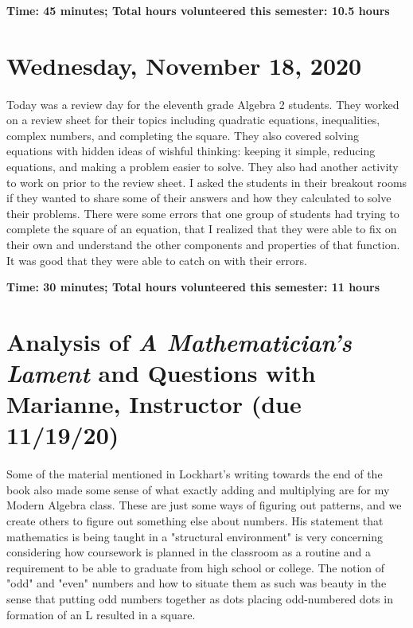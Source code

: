 \documentclass{article}
\begin{document}
\textbf{Time: 45 minutes; Total hours volunteered this semester: 10.5 hours}

\section{Wednesday, November 18, 2020}

\paragraph{}Today was a review day for the eleventh grade Algebra 2 students. They worked on a review sheet for their topics including quadratic equations, inequalities, complex numbers, and completing the square. They also covered solving equations with hidden ideas of wishful thinking: keeping it simple, reducing equations, and making a problem easier to solve. They also had another activity to work on prior to the review sheet. I asked the students in their breakout rooms if they wanted to share some of their answers and how they calculated to solve their problems. There were some errors that one group of students had trying to complete the square of an equation, that I realized that they were able to fix on their own and understand the other components and properties of that function. It was good that they were able to catch on with their errors. 

\textbf{Time: 30 minutes; Total hours volunteered this semester: 11 hours}

\section{Analysis of \textit{A Mathematician's Lament} and Questions with Marianne, Instructor (due 11/19/20)}

\paragraph{} 
Some of the material mentioned in Lockhart's writing towards the end of the book also made some sense of what exactly adding and multiplying are for my Modern Algebra class. These are just some ways of figuring out patterns, and we create others to figure out something else about numbers. His statement that mathematics is being taught in a "structural environment" is very concerning considering how coursework is planned in the classroom as a routine and a requirement to be able to graduate from high school or college. The notion of "odd" and "even" numbers and how to situate them as such was beauty in the sense that putting odd numbers together as dots placing odd-numbered dots in formation of an L resulted in a square. 
\end{document}
